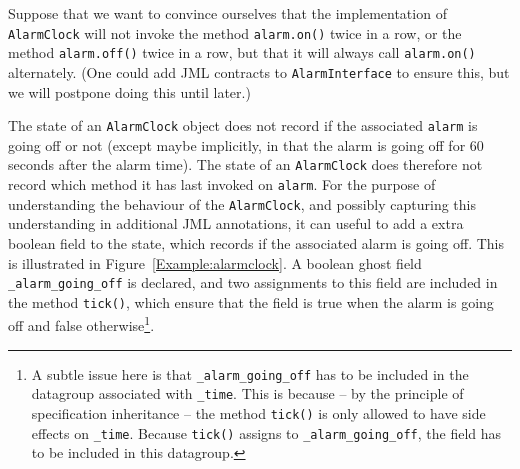 \documentclass{llncs}
\begin{document}
% 
% 
% 
% 
% 

\medskip

Suppose that we want to convince ourselves that the implementation of 
\texttt{AlarmClock} will not invoke the method \texttt{alarm.on()}
twice in a row, or the method \texttt{alarm.off()} twice in a row,
but that it will always call \texttt{alarm.on()} alternately. 
(One could add JML contracts to \texttt{AlarmInterface} to ensure this,
but we will postpone doing this until later.)

The state of an \texttt{AlarmClock} object does not record if the associated
\texttt{alarm} is going off or not (except maybe implicitly, in that the alarm is 
going off for 60 seconds after the alarm time). The state of an \texttt{AlarmClock}
does therefore not record which method it has last invoked on \texttt{alarm}.
For the purpose of understanding the behaviour of the \texttt{AlarmClock}, 
and possibly capturing this understanding in additional JML annotations,
it can useful to add a extra boolean field to the state, which records if 
the associated alarm is going off.
This is illustrated in Figure~\ref{Example:alarmclock}.
A boolean ghost field \texttt{\_alarm\_going\_off} is declared, 
and two assignments to this field are included in the method \texttt{tick()},
which ensure that the field is true when the alarm is going off and false
otherwise\footnote{A subtle issue here is that \texttt{\_alarm\_going\_off} 
has to be included in the datagroup associated with \texttt{\_time}. This is 
because --  by the principle of specification inheritance -- the method 
\texttt{tick()} is only allowed to have side effects on \texttt{\_time}.
Because \texttt{tick()} assigns to \texttt{\_alarm\_going\_off}, the field
has to be included in this datagroup.}.
\end{document}
